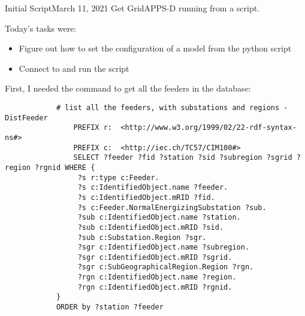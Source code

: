 \begin{entry}{Initial Script}{March 11, 2021}
    \objective
    Get GridAPPS-D running from a script.

    \outline

    Today's tasks were:
        \begin{itemize}
            \item Figure out how to set the configuration of a model from the python script
            \item Connect to and run the script

        \end{itemize}

    \procedures

        First, I needed the command to get all the feeders in the database:
        \begin{verbatim}
            # list all the feeders, with substations and regions - DistFeeder
                PREFIX r:  <http://www.w3.org/1999/02/22-rdf-syntax-ns#>
                PREFIX c:  <http://iec.ch/TC57/CIM100#>
                SELECT ?feeder ?fid ?station ?sid ?subregion ?sgrid ?region ?rgnid WHERE {
                 ?s r:type c:Feeder.
                 ?s c:IdentifiedObject.name ?feeder.
                 ?s c:IdentifiedObject.mRID ?fid.
                 ?s c:Feeder.NormalEnergizingSubstation ?sub.
                 ?sub c:IdentifiedObject.name ?station.
                 ?sub c:IdentifiedObject.mRID ?sid.
                 ?sub c:Substation.Region ?sgr.
                 ?sgr c:IdentifiedObject.name ?subregion.
                 ?sgr c:IdentifiedObject.mRID ?sgrid.
                 ?sgr c:SubGeographicalRegion.Region ?rgn.
                 ?rgn c:IdentifiedObject.name ?region.
                 ?rgn c:IdentifiedObject.mRID ?rgnid.
            }
            ORDER by ?station ?feeder
        \end{verbatim}


\end{entry}
